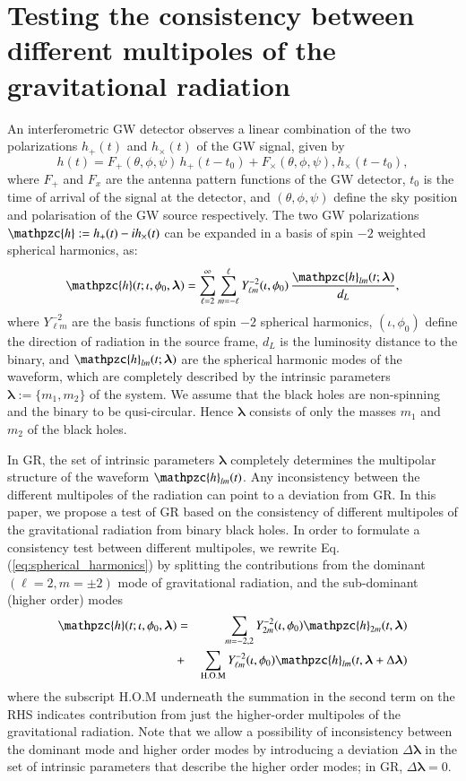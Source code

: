 \documentclass[prd,preprintnumbers,twocolumn,eqsecnum,floatfix,a4paper,nofootinbib,superscriptaddress]{revtex4}
\newcommand{\h}{\mathpzc{h}}
\newcommand{\Ylm}{{Y}^{-2}_{\ell m}}
\newcommand{\blambda}{\bm{\lambda}}
\begin{document}
\section{Testing the consistency between different multipoles of the gravitational radiation}
An interferometric GW detector observes a linear combination of the two polarizations $h_+(t)$ and $h_\times(t)$ of the GW signal, given by 
\begin{equation}
h(t) = F_+(\theta, \phi, \psi) \, h_+(t-t_0) + F_{\times}(\theta, \phi, \psi), {h}_{\times}(t-t_0), 
\label{eq:det_response}
\end{equation}
where $F_+$ and $F_x$ are the antenna pattern functions of the GW detector, $t_0$ is the time of arrival of the signal at the detector, and $(\theta, \phi, \psi)$ define the sky position and polarisation of the GW source respectively. The two GW polarizations $\h := h_+(t) -i h_\times(t)$ can be expanded in a basis of spin $-2$ weighted spherical harmonics, as:
\begin{equation}
\h(t; \iota, \phi_0, \blambda) = \sum _{\ell=2}^{\infty} \sum _{m=-\ell}^{\ell} \Ylm (\iota, \phi_0) \, \frac{{\h}_{lm}(t; \blambda)}{d_L}, 
\label{eq:spherical_harmonics}
\end{equation}
where $\Ylm$ are the basis functions of spin $-2$ spherical harmonics, $(\iota, \phi_0)$ define the direction of radiation in the source frame, $d_L$ is  the luminosity distance to the binary, and 
${\h}_{lm}(t; \blambda)$ are the spherical harmonic modes of the waveform, which are completely described by the intrinsic parameters $\blambda := \{m_1, m_2\}$ of the system. We assume that the black holes are non-spinning and the binary to be qusi-circular. Hence $\blambda$ consists of only the masses $m_1$ and $m_2$ of the black holes. 

In GR, the set of intrinsic parameters $\blambda$ completely determines the multipolar structure of the waveform ${\h}_{lm}(t)$. Any inconsistency between the different multipoles of the radiation can point to a deviation from GR. In this paper, we propose a test of GR based on the consistency of different multipoles of the gravitational radiation from binary black holes. In order to formulate a consistency test between different multipoles, we rewrite Eq.(\ref{eq:spherical_harmonics}) by splitting the contributions from the dominant $(\ell = 2, m = \pm 2)$ mode of gravitational radiation, and the sub-dominant (higher order) modes 
\begin{eqnarray}
\h(t; \iota, \phi_0, \blambda) & = & \sum_{m = -2,2} Y^{-2}_{2m} (\iota, \phi_0) {\h}_{2m}(t, \blambda)  \nonumber \\ 
 & + & \sum _{\text{H.O.M}} \Ylm (\iota, \phi_0) \h_{lm}(t, \blambda+\Delta \blambda)
\label{eq:test_HM}
\end{eqnarray}
where the subscript H.O.M underneath the summation in the second term on the RHS indicates contribution from just the higher-order multipoles of the gravitational radiation. Note that we allow a possibility of inconsistency between the dominant mode and higher order modes by introducing a deviation $\Delta \blambda$ in the set of intrinsic parameters that describe the higher order modes; in GR,  $\Delta \blambda = 0$. 
\end{document}

